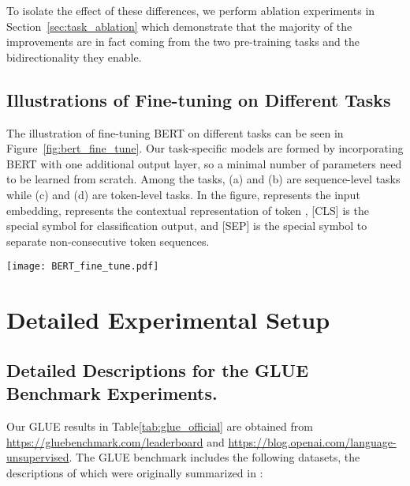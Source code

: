\documentclass[11pt,a4paper]{article}
\newcommand\bert{BERT\xspace}
\begin{document}
To isolate the effect of these differences, we perform ablation experiments in Section~\ref{sec:task_ablation} which demonstrate that the majority of the improvements are in fact coming from the two pre-training tasks and the bidirectionality they enable.



\subsection{Illustrations of Fine-tuning on Different Tasks}
\label{appendix:sec:fine_tune_details_and_figures}

The illustration of fine-tuning BERT on different tasks can be seen in
Figure~\ref{fig:bert_fine_tune}. Our task-specific models are formed by incorporating \bert with one additional output layer, so a  minimal number of parameters need to be learned from scratch. Among the tasks, (a) and (b) are sequence-level tasks while (c) and (d) are token-level tasks. In the figure,  represents the input embedding,  represents the contextual representation of token , \textsc{[CLS]} is the special symbol for classification output, and \textsc{[SEP]} is the special symbol to separate non-consecutive token sequences.
\begin{figure*}[ht]
\begin{center}
\texttt{[image: BERT\_fine\_tune.pdf]}
\end{center}
\caption{Illustrations of Fine-tuning BERT on Different Tasks.}
\label{fig:bert_fine_tune}
\end{figure*}




 \section{Detailed Experimental Setup}
\label{appendix:sec:exp_details}

\subsection{Detailed Descriptions for the GLUE Benchmark Experiments.}
\label{appendix:sec:glue}

Our GLUE results in Table\ref{tab:glue_official} are obtained from  \url{https://gluebenchmark.com/leaderboard} and \url{https://blog.openai.com/language-unsupervised}.
The GLUE benchmark includes the following datasets, the descriptions of which were originally summarized in \citet{wang-etal:2018:_glue}:
\end{document}
